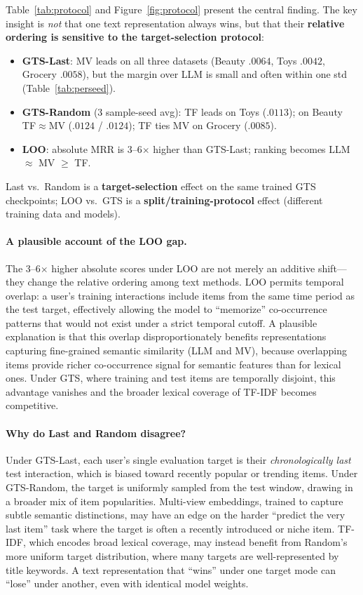 \documentclass[sigconf,natbib=true,anonymous]{acmart}
\newcommand{\tfidf}{\textsc{TF-IDF}\xspace}
\begin{document}
Table~\ref{tab:protocol} and Figure~\ref{fig:protocol} present the central finding.
The key insight is \emph{not} that one text representation always wins, but that their \textbf{relative ordering is sensitive to the target-selection protocol}:

\begin{itemize}[leftmargin=*,itemsep=1pt]
\item \textbf{GTS-Last}: MV leads on all three datasets (Beauty $.0064$, Toys $.0042$, Grocery $.0058$), but the margin over LLM is small and often within one std (Table~\ref{tab:perseed}).
\item \textbf{GTS-Random} (3 sample-seed avg): TF leads on Toys ($.0113$); on Beauty TF$\approx$MV ($.0124$ / $.0124$); TF ties MV on Grocery ($.0085$).
\item \textbf{LOO}: absolute MRR is 3--6$\times$ higher than GTS-Last; ranking becomes LLM $\approx$ MV $\ge$ TF.
\end{itemize}
Last vs.\ Random is a \textbf{target-selection} effect on the same trained GTS checkpoints; LOO vs.\ GTS is a \textbf{split/training-protocol} effect (different training data and models).

\paragraph{A plausible account of the LOO gap.}
The 3--6$\times$ higher absolute scores under LOO are not merely an additive shift---they change the relative ordering among text methods.
LOO permits temporal overlap: a user's training interactions include items from the same time period as the test target, effectively allowing the model to ``memorize'' co-occurrence patterns that would not exist under a strict temporal cutoff.
A plausible explanation is that this overlap disproportionately benefits representations capturing fine-grained semantic similarity (LLM and MV), because overlapping items provide richer co-occurrence signal for semantic features than for lexical ones.
Under GTS, where training and test items are temporally disjoint, this advantage vanishes and the broader lexical coverage of \tfidf becomes competitive.

\paragraph{Why do Last and Random disagree?}
Under GTS-Last, each user's single evaluation target is their \emph{chronologically last} test interaction, which is biased toward recently popular or trending items.
Under GTS-Random, the target is uniformly sampled from the test window, drawing in a broader mix of item popularities.
Multi-view embeddings, trained to capture subtle semantic distinctions, may have an edge on the harder ``predict the very last item'' task where the target is often a recently introduced or niche item.
TF-IDF, which encodes broad lexical coverage, may instead benefit from Random's more uniform target distribution, where many targets are well-represented by title keywords.
A text representation that ``wins'' under one target mode can ``lose'' under another, even with identical model weights.
\end{document}
